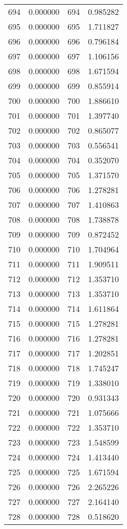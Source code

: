 \documentclass[12pt]{article}
\begin{document}
\begin{longtable}{@{}cccc@{}}
694 & 0.000000 & 694 & 0.985282 \\
695 & 0.000000 & 695 & 1.711827 \\
696 & 0.000000 & 696 & 0.796184 \\
697 & 0.000000 & 697 & 1.106156 \\
698 & 0.000000 & 698 & 1.671594 \\
699 & 0.000000 & 699 & 0.855914 \\
700 & 0.000000 & 700 & 1.886610 \\
701 & 0.000000 & 701 & 1.397740 \\
702 & 0.000000 & 702 & 0.865077 \\
703 & 0.000000 & 703 & 0.556541 \\
704 & 0.000000 & 704 & 0.352070 \\
705 & 0.000000 & 705 & 1.371570 \\
706 & 0.000000 & 706 & 1.278281 \\
707 & 0.000000 & 707 & 1.410863 \\
708 & 0.000000 & 708 & 1.738878 \\
709 & 0.000000 & 709 & 0.872452 \\
710 & 0.000000 & 710 & 1.704964 \\
711 & 0.000000 & 711 & 1.909511 \\
712 & 0.000000 & 712 & 1.353710 \\
713 & 0.000000 & 713 & 1.353710 \\
714 & 0.000000 & 714 & 1.611864 \\
715 & 0.000000 & 715 & 1.278281 \\
716 & 0.000000 & 716 & 1.278281 \\
717 & 0.000000 & 717 & 1.202851 \\
718 & 0.000000 & 718 & 1.745247 \\
719 & 0.000000 & 719 & 1.338010 \\
720 & 0.000000 & 720 & 0.931343 \\
721 & 0.000000 & 721 & 1.075666 \\
722 & 0.000000 & 722 & 1.353710 \\
723 & 0.000000 & 723 & 1.548599 \\
724 & 0.000000 & 724 & 1.413440 \\
725 & 0.000000 & 725 & 1.671594 \\
726 & 0.000000 & 726 & 2.265226 \\
727 & 0.000000 & 727 & 2.164140 \\
728 & 0.000000 & 728 & 0.518620 \\

\end{longtable}
\end{document}
